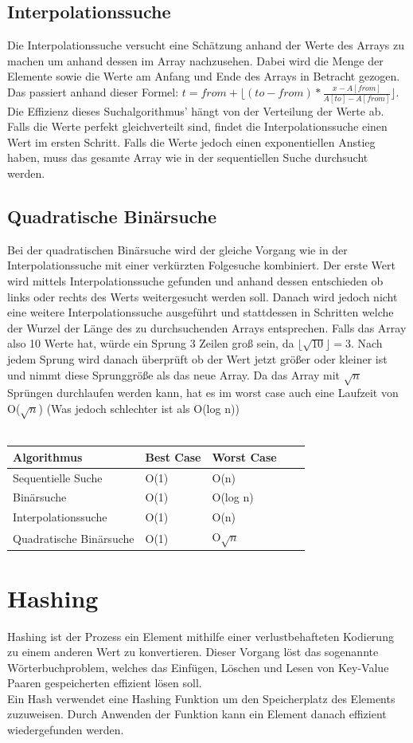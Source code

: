 \documentclass{article}
\begin{document}
	\subsection{Interpolationssuche}
	Die Interpolationssuche versucht eine Schätzung anhand der Werte des Arrays zu machen um anhand dessen im Array nachzusehen. Dabei wird die Menge der Elemente sowie die Werte am Anfang und Ende des Arrays in Betracht gezogen. Das passiert anhand dieser Formel: $t=from+\lfloor(to-from)*\frac{x-A[from]}{A[to]-A[from]}\rfloor$. Die Effizienz dieses Suchalgorithmus' hängt von der Verteilung der Werte ab. Falls die Werte perfekt gleichverteilt sind, findet die Interpolationssuche einen Wert im ersten Schritt. Falls die Werte jedoch einen exponentiellen Anstieg haben, muss das gesamte Array wie in der sequentiellen Suche durchsucht werden.
	\subsection{Quadratische Binärsuche}
	Bei der quadratischen Binärsuche wird der gleiche Vorgang wie in der Interpolationssuche mit einer verkürzten Folgesuche kombiniert. Der erste Wert wird mittels Interpolationssuche gefunden und anhand dessen entschieden ob links oder rechts des Werts weitergesucht werden soll. Danach wird jedoch nicht eine weitere Interpolationssuche ausgeführt und stattdessen in Schritten welche der Wurzel der Länge des zu durchsuchenden Arrays entsprechen. Falls das Array also 10 Werte hat, würde ein Sprung 3 Zeilen groß sein, da $\lfloor\sqrt{10}\rfloor=3$. Nach jedem Sprung wird danach überprüft ob der Wert jetzt größer oder kleiner ist und nimmt diese Sprunggröße als das neue Array. Da das Array mit $\sqrt{n}$ Sprüngen durchlaufen werden kann, hat es im worst case auch eine Laufzeit von O($\sqrt{n}$) (Was jedoch schlechter ist als O(log n)) \\ \\
	\begin{tabular}{| l | l | l | l | l |}
		\toprule
		Algorithmus & Best Case & Worst Case \\ \midrule
		Sequentielle Suche & O(1) & O(n) \\ \hline
		Binärsuche & O(1) & O(log n) \\ \hline
		Interpolationssuche & O(1) & O(n) \\ \hline
		Quadratische Binärsuche & O(1) & O$\sqrt{n}$ \\
		\bottomrule
	\end{tabular}
	\section{Hashing}
	Hashing ist der Prozess ein Element mithilfe einer verlustbehafteten Kodierung zu einem anderen Wert zu konvertieren. Dieser Vorgang löst das sogenannte Wörterbuchproblem, welches das Einfügen, Löschen und Lesen von Key-Value Paaren gespeicherten effizient lösen soll. \\
	Ein Hash verwendet eine Hashing Funktion um den Speicherplatz des Elements zuzuweisen. Durch Anwenden der Funktion kann ein Element danach effizient wiedergefunden werden. 
\end{document}
